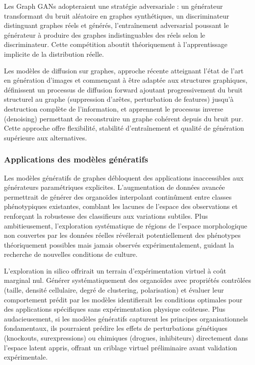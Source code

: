 Les Graph GANs adopteraient une stratégie adversariale : un générateur transformant du bruit aléatoire en graphes synthétiques, un discriminateur distinguant graphes réels et générés, l'entraînement adversarial poussant le générateur à produire des graphes indistinguables des réels selon le discriminateur. Cette compétition aboutit théoriquement à l'apprentissage implicite de la distribution réelle.

Les modèles de diffusion sur graphes, approche récente atteignant l'état de l'art en génération d'images et commençant à être adaptée aux structures graphiques, définissent un processus de diffusion forward ajoutant progressivement du bruit structurel au graphe (suppression d'arêtes, perturbation de features) jusqu'à destruction complète de l'information, et apprennent le processus inverse (denoising) permettant de reconstruire un graphe cohérent depuis du bruit pur. Cette approche offre flexibilité, stabilité d'entraînement et qualité de génération supérieure aux alternatives.

\subsubsection{Applications des modèles génératifs}

Les modèles génératifs de graphes débloquent des applications inaccessibles aux générateurs paramétriques explicites. L'augmentation de données avancée permettrait de générer des organoïdes interpolant continûment entre classes phénotypiques existantes, comblant les lacunes de l'espace des observations et renforçant la robustesse des classifieurs aux variations subtiles. Plus ambitieusement, l'exploration systématique de régions de l'espace morphologique non couvertes par les données réelles révélerait potentiellement des phénotypes théoriquement possibles mais jamais observés expérimentalement, guidant la recherche de nouvelles conditions de culture.

L'exploration in silico offrirait un terrain d'expérimentation virtuel à coût marginal nul. Générer systématiquement des organoïdes avec propriétés contrôlées (taille, densité cellulaire, degré de clustering, polarisation) et évaluer leur comportement prédit par les modèles identifierait les conditions optimales pour des applications spécifiques sans expérimentation physique coûteuse. Plus audacieusement, si les modèles génératifs capturent les principes organisationnels fondamentaux, ils pourraient prédire les effets de perturbations génétiques (knockouts, surexpressions) ou chimiques (drogues, inhibiteurs) directement dans l'espace latent appris, offrant un criblage virtuel préliminaire avant validation expérimentale.

